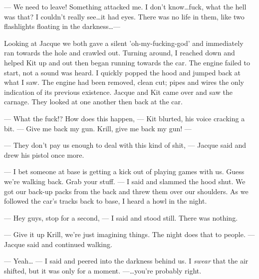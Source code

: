 --- We need to leave! Something attacked me. I don't know\ldots{}fuck, what the hell was that? I couldn't really see\ldots{}it had eyes. There was no life in them, like two flashlights floating in the darkness\dots ---

Looking at Jacque we both gave a silent 'oh-my-fucking-god' and immediately ran towards the hole and crawled out. Turning around, I reached down and helped Kit up and out then began running towards the car. The engine failed to start, not a sound was heard. I quickly popped the hood and jumped back at what I saw. The engine had been removed, clean cut; pipes and wires the only indication of its previous existence. Jacque and Kit came over and saw the carnage. They looked at one another then back at the car.

--- What the fuck!? How does this happen, --- Kit blurted, his voice cracking a bit. --- Give me back my gun. Krill, give me back my gun! ---

--- They don't pay us enough to deal with this kind of shit, --- Jacque said and drew his pistol once more.

--- I bet someone at base is getting a kick out of playing games with us. Guess we're walking back. Grab your stuff. --- I said and slammed the hood shut. We got our back-up packs from the back and threw them over our shoulders. As we followed the car's tracks back to base, I heard a howl in the night.

--- Hey guys, stop for a second, --- I said and stood still. There was nothing.

--- Give it up Krill, we're just imagining things. The night does that to people. --- Jacque said and continued walking.

--- Yeah\ldots{} --- I said and peered into the darkness behind us. I \textit{swear} that the air shifted, but it was only for a moment. ---\ldots{}you're probably right.
